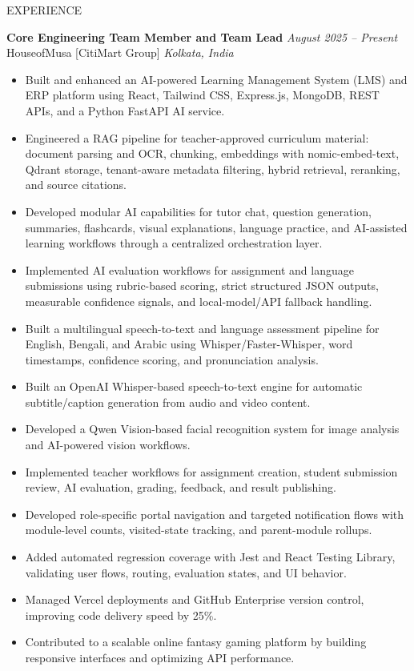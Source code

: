 \documentclass{resume}
\begin{document}
\begin{rSection}{EXPERIENCE}

\textbf{Core Engineering Team Member and Team Lead} \hfill \textit{August 2025 -- Present}\\
HouseofMusa [CitiMart Group] \hfill \textit{Kolkata, India}
\begin{itemize}[leftmargin=*,nosep]
    \item Built and enhanced an AI-powered Learning Management System (LMS) and ERP platform using React, Tailwind CSS, Express.js, MongoDB, REST APIs, and a Python FastAPI AI service.
    \item Engineered a RAG pipeline for teacher-approved curriculum material: document parsing and OCR, chunking, embeddings with nomic-embed-text, Qdrant storage, tenant-aware metadata filtering, hybrid retrieval, reranking, and source citations.
    \item Developed modular AI capabilities for tutor chat, question generation, summaries, flashcards, visual explanations, language practice, and AI-assisted learning workflows through a centralized orchestration layer.
    \item Implemented AI evaluation workflows for assignment and language submissions using rubric-based scoring, strict structured JSON outputs, measurable confidence signals, and local-model/API fallback handling.
    \item Built a multilingual speech-to-text and language assessment pipeline for English, Bengali, and Arabic using Whisper/Faster-Whisper, word timestamps, confidence scoring, and pronunciation analysis.
    \item Built an OpenAI Whisper-based speech-to-text engine for automatic subtitle/caption generation from audio and video content.
    \item Developed a Qwen Vision-based facial recognition system for image analysis and AI-powered vision workflows.
    \item Implemented teacher workflows for assignment creation, student submission review, AI evaluation, grading, feedback, and result publishing.
    \item Developed role-specific portal navigation and targeted notification flows with module-level counts, visited-state tracking, and parent-module rollups.
    \item Added automated regression coverage with Jest and React Testing Library, validating user flows, routing, evaluation states, and UI behavior.
    \item Managed Vercel deployments and GitHub Enterprise version control, improving code delivery speed by 25\%.
    \item Contributed to a scalable online fantasy gaming platform by building responsive interfaces and optimizing API performance.
\end{itemize}

\end{rSection}
\end{document}
